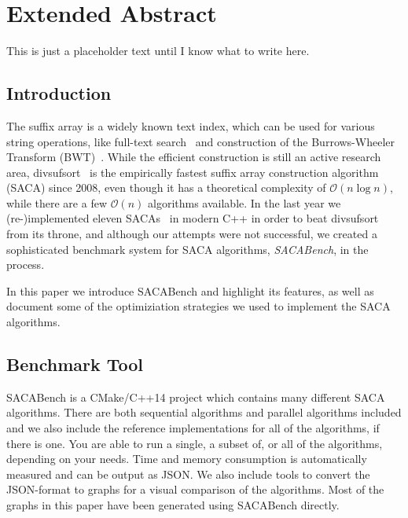 \chapter{Extended Abstract}


This  is just a placeholder text until I know what to write here.

\section{Introduction}

The suffix array is a widely known text index, which can be used for various string operations, like full-text search~\cite{makinen} and construction of the Burrows-Wheeler Transform (BWT)~\cite{BWT}.
While the efficient construction is still an active research area,
divsufsort~\cite{saca:5,saca:5:repo} is the empirically fastest suffix array construction algorithm (SACA) since 2008,
even though it has a theoretical complexity of $\mathcal O (n \log n)$,
while there are a few $\mathcal O(n)$ algorithms available.
In the last year we (re-)implemented eleven SACAs~\cite{saca:3,saca:11,saca:5,saca:9,saca:1,saca:8,saca:4,saca:7,saca:10,saca:6,saca:2} in modern C++ in order to beat divsufsort from its throne,
and although our attempts were not successful,
we created a sophisticated benchmark system for SACA algorithms, \emph{SACABench}, in the process.

In this paper we introduce SACABench and highlight its features,
as well as document some of the optimiziation strategies we used to implement the SACA algorithms. \blindtext

\section{Benchmark Tool}

SACABench is a CMake/C++14 project which contains many different SACA algorithms.
There are both sequential algorithms and parallel algorithms included and we also include the reference implementations for all of the algorithms, if there is one.
You are able to run a single, a subset of, or all of the algorithms, depending on your needs.
Time and memory consumption is automatically measured and can be output as JSON.
We also include tools to convert the JSON-format to graphs for a visual comparison of the algorithms.
Most of the graphs in this paper have been generated using SACABench directly.

